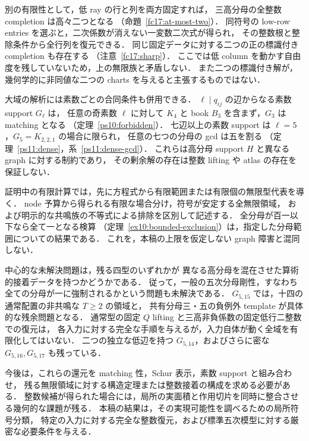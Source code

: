 別の有限性として，低 ray の行と列を両方固定すれば，
三高分母の全整数 completion は高々二つとなる
（命題~\ref{fc17:at-most-two}）．
同符号の low-row entries を選ぶと，二次係数が消えない一変数二次式が得られ，
その整数根と整除条件から全行列を復元できる．
同じ固定データに対する二つの正の標識付き completion も存在する
（注意~\ref{fc17:sharp}）．
ここでは低 column を動かす自由度を残していないため，上の無限族と矛盾しない．
また二つの標識付き解が，幾何学的に非同値な二つの charts を与えると主張するものではない．

大域の解析には素数ごとの合同条件も併用できる．
$\ell\mid q_{ij}$ の辺からなる素数 support $G_\ell$ は，
任意の奇素数 $\ell$ に対して $K_4$ と book $B_3$ を含まず，$G_3$ は matching となる
（定理~\ref{ps10:forbidden}）．
七辺以上の素数 support は $\ell=5$，$G_5=K_{2,2,1}$ の場合に限られ，
任意の七つの分母の gcd は五を割る
（定理~\ref{ps11:dense}，系~\ref{ps11:dense-gcd}）．
これらは高分母 support $H$ と異なる graph に対する制約であり，
その剰余解の存在は整数 lifting や atlas の存在を保証しない．

証明中の有限計算では，先に方程式から有限範囲または有限個の無限型代表を導く．
node 予算から得られる有限な場合分け，符号が安定する全無限領域，
および明示的な共鳴族の不等式による排除を区別して記述する．
全分母が百一以下なら全て一となる検算
（定理~\ref{ex10:bounded-exclusion}）は，指定した分母範囲についての結果である．
これを，本稿の上限を仮定しない graph 障害と混同しない．

中心的な未解決問題は，残る四型のいずれかが
異なる高分母を混在させた算術的接着データを持つかどうかである．
従って，一般の五次分母剛性，すなわち全ての分母が一に強制されるかという問題も未解決である．
$G_{5,15}$ では，十四の通常配置の非共鳴な $T\ge2$ の領域と，
共有分母三・五の負例外 template が具体的な残余問題となる．
通常型の固定 $Q$ lifting と三高非負係数の固定低行二整数での復元は，
各入力に対する完全な手順を与えるが，入力自体が動く全域を有限化してはいない．
二つの独立な低辺を持つ $G_{5,14}$，およびさらに密な $G_{5,16},G_{5,17}$ も残っている．

今後は，これらの還元を matching 性，Schur 表示，素数 support と組み合わせ，
残る無限領域に対する構造定理または整数接着の構成を求める必要がある．
整数候補が得られた場合には，局所の実面積と作用切片を同時に整合させる幾何的な課題が残る．
本稿の結果は，その実現可能性を調べるための局所符号分類，
特定の入力に対する完全な整数復元，および標準五次模型に対する厳密な必要条件を与える．
